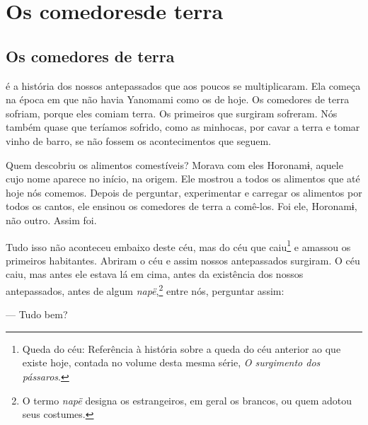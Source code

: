\part[Os comedores de terra]{Os comedores\break de terra}

\chapter{Os comedores de terra}

 é a história dos nossos antepassados que aos poucos se
multiplicaram. Ela começa na época em que não havia Yanomami como os de
hoje. Os comedores de terra sofriam, porque eles comiam terra. Os
primeiros que surgiram sofreram. Nós também quase que teríamos sofrido,
como as minhocas, por cavar a terra e tomar vinho de barro, se não
fossem os acontecimentos que seguem.	


Quem descobriu os alimentos comestíveis? Morava com eles Horonamɨ,
aquele cujo nome aparece no início, na origem. Ele mostrou a todos os
alimentos que até hoje nós comemos. Depois de perguntar, experimentar e
carregar os alimentos por todos os cantos, ele ensinou os comedores de
terra a comê-los. Foi ele, Horonamɨ, não outro. Assim foi.

Tudo isso não aconteceu embaixo deste céu, mas do céu que caiu\footnote{Queda do céu: Referência à história sobre a queda do céu anterior ao que existe hoje, contada no volume desta mesma série, \textit{O surgimento dos pássaros}.} e amassou
os primeiros habitantes. Abriram o céu e assim nossos antepassados
surgiram. O céu caiu, mas antes ele estava lá em cima, antes da
existência dos nossos antepassados, antes de algum \textit{napë},\footnote{O termo \textit{napë} designa os estrangeiros, em geral os brancos, ou quem adotou seus costumes.} entre
nós, perguntar assim:

--- Tudo bem? 


